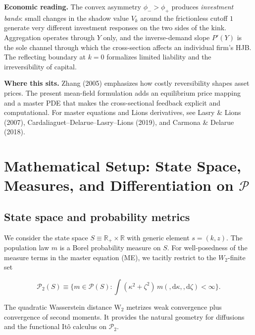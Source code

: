 ﻿\documentclass[11pt,letterpaper,oneside]{article}
\numberwithin{equation}{section}
\newcommand{\R}{\mathbb{R}}
\newcommand{\1}{\mathbf{1}}
\newcommand{\diff}{,\mathrm{d}}
\begin{document}
\begin{tcolorbox}[didacticstyle]
\textbf{Economic reading.} The convex asymmetry $\phi_->\phi_+$ produces \emph{investment bands}: small changes in the shadow value $V_k$ around the frictionless cutoff $1$ generate very different investment responses on the two sides of the kink. Aggregation operates through $Y$ only, and the inverse-demand slope $P'(Y)$ is the sole channel through which the cross-section affects an individual firm's HJB. The reflecting boundary at $k=0$ formalizes limited liability and the irreversibility of capital.
\end{tcolorbox}


\begin{tcolorbox}[literaturestyle]
\textbf{Where this sits.} Zhang (2005) emphasizes how costly reversibility shapes asset prices. The present mean-field formulation adds an equilibrium price mapping and a master PDE that makes the cross-sectional feedback explicit and computational. For master equations and Lions derivatives, see Lasry \& Lions (2007), Cardaliaguet--Delarue--Lasry--Lions (2019), and Carmona \& Delarue (2018).
\end{tcolorbox}


\section{Mathematical Setup: State Space, Measures, and Differentiation on \texorpdfstring{$\mathcal P$}{P}}\label{sec:math-setup}

\subsection{State space and probability metrics}\label{sec:state-metrics}
We consider the state space $S\equiv \R_+\times\R$ with generic element $s=(k,z)$. The population law $m$ is a Borel probability measure on $S$. For well-posedness of the measure terms in the master equation (ME), we tacitly restrict to the $W_2$-finite set

$$
\mathcal P_2(S)\equiv\Big\{ m\in\mathcal P(S): \int (\kappa^2 + \zeta^2)\, m(\diff\kappa,\diff\zeta) < \infty\Big\}.
$$

The quadratic Wasserstein distance $\mathrm{W}_2$ metrizes weak convergence plus convergence of second moments. It provides the natural geometry for diffusions and the functional Itô calculus on $\mathcal P_2$.
\end{document}
